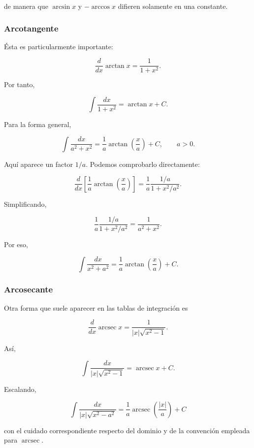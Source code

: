 de manera que \(\arcsin x\) y \(-\arccos x\) difieren solamente
en una constante.

\subsubsection*{Arcotangente}

Ésta es particularmente importante:

\[
\frac{d}{dx}\arctan x
=
\frac{1}{1+x^2}.
\]

Por tanto,

\[
\boxed{
\int\frac{dx}{1+x^2}
=
\arctan x+C
}.
\]

Para la forma general,

\[
\boxed{
\int\frac{dx}{a^2+x^2}
=
\frac1a\arctan\left(\frac{x}{a}\right)+C,
\qquad a>0.
}
\]

Aquí aparece un factor \(1/a\). Podemos comprobarlo directamente:

\[
\frac{d}{dx}
\left[
\frac1a\arctan\left(\frac{x}{a}\right)
\right]
=
\frac1a
\frac{1/a}{1+x^2/a^2}.
\]

Simplificando,

\[
\frac1a
\frac{1/a}{1+x^2/a^2}
=
\frac{1}{a^2+x^2}.
\]

Por eso,

\[
\boxed{
\int\frac{dx}{x^2+a^2}
=
\frac1a\arctan\left(\frac{x}{a}\right)+C.
}
\]

\subsubsection*{Arcosecante}

Otra forma que suele aparecer en las tablas de integración es

\[
\frac{d}{dx}\operatorname{arcsec}x
=
\frac{1}{|x|\sqrt{x^2-1}}.
\]

Así,

\[
\boxed{
\int
\frac{dx}{|x|\sqrt{x^2-1}}
=
\operatorname{arcsec}x+C
}.
\]

Escalando,

\[
\boxed{
\int
\frac{dx}{|x|\sqrt{x^2-a^2}}
=
\frac1a
\operatorname{arcsec}\left(\frac{|x|}{a}\right)+C
}
\]

con el cuidado correspondiente respecto del dominio y de la
convención empleada para \(\operatorname{arcsec}\).

